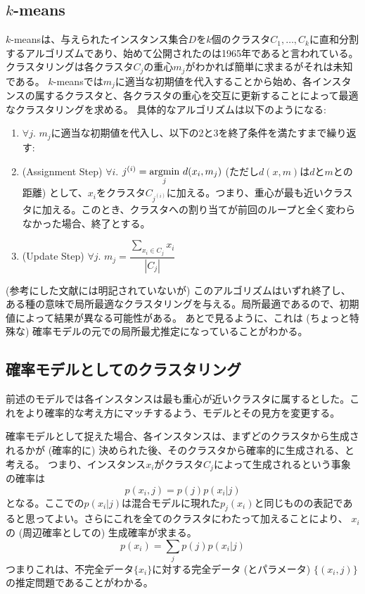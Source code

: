 \documentclass[9pt,draft,twocolumn]{jsarticle}
\newcommand{\argmin}{\operatornamewithlimits{argmin}}
\begin{document}
\subsection{$k$-means}
$k$-meansは、与えられたインスタンス集合$D$を$k$個のクラスタ$C_1,\ldots,C_k$に直和分割するアルゴリズムであり、始めて公開されたのは1965年であると言われている。
クラスタリングは各クラスタ$C_j$の重心$m_j$がわかれば簡単に求まるがそれは未知である。
$k$-meansでは$m_j$に適当な初期値を代入することから始め、各インスタンスの属するクラスタと、各クラスタの重心を交互に更新することによって最適なクラスタリングを求める。
具体的なアルゴリズムは以下のようになる:
\begin{enumerate}
  \item $\forall j$. $m_j$に適当な初期値を代入し、以下の2と3を終了条件を満たすまで繰り返す:
  \item (Assignment Step) $\forall i$. $j^{(i)}= {\displaystyle\argmin_j}
  \ d(x_i,m_j)$ (ただし$d(x,m)$は$d$と$m$との距離)
  として、$x_i$をクラスタ$C_{j^{(i)}}$に加える。つまり、重心が最も近いクラスタに加える。このとき、クラスタへの割り当てが前回のループと全く変わらなかった場合、終了とする。
  \item (Update Step) $\forall j$.
  $m_j=\dfrac{\displaystyle\sum_{x_i \in C_j} x_i}{|C_j|}$
\end{enumerate}
(参考にした文献には明記されていないが) 
このアルゴリズムはいずれ終了し、ある種の意味で局所最適なクラスタリングを与える。局所最適であるので、初期値によって結果が異なる可能性がある。
あとで見るように、これは (ちょっと特殊な) 確率モデルの元での局所最尤推定になっていることがわかる。

\subsection{確率モデルとしてのクラスタリング}
前述のモデルでは各インスタンスは最も重心が近いクラスタに属するとした。これをより確率的な考え方にマッチするよう、モデルとその見方を変更する。

確率モデルとして捉えた場合、各インスタンスは、まずどのクラスタから生成されるかが (確率的に) 決められた後、そのクラスタから確率的に生成される、と考える。
つまり、インスタンス$x_i$がクラスタ$C_j$によって生成されるという事象の確率は
\[ p(x_i,j)= p(j) p(x_i | j) \]
となる。ここでの$p(x_i | j)$は混合モデルに現れた$p_j(x_i)$と同じものの表記であると思ってよい。さらにこれを全てのクラスタにわたって加えることにより、
$x_i$の (周辺確率としての) 生成確率が求まる。
\[ p(x_i)= \sum_j p(j) p(x_i | j) \]
つまりこれは、不完全データ$\{x_i\}$に対する完全データ (とパラメータ) $\{(x_i,j)\}$の推定問題であることがわかる。
\end{document}
